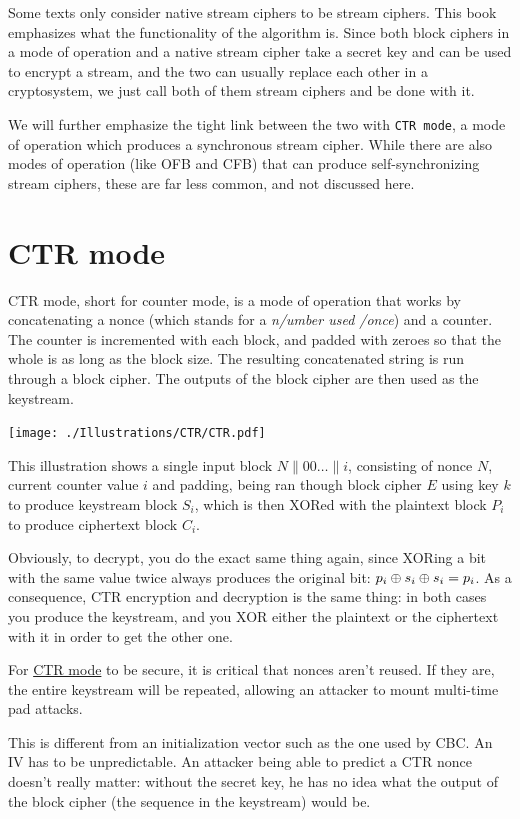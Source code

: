 \documentclass[11pt,ebook,table,dvipsnames]{memoir}
\begin{document}
Some texts only consider native \glspl{stream cipher} to be stream
ciphers. This book emphasizes what the functionality of the algorithm
is. Since both block ciphers in a \gls{mode of operation} and a native
stream cipher take a secret key and can be used to encrypt a stream,
and the two can usually replace each other in a cryptosystem, we just
call both of them stream ciphers and be done with it.

We will further emphasize the tight link between the two with \texttt{CTR
mode}, a mode of operation which produces a synchronous stream
cipher. While there are also modes of operation (like OFB and CFB)
that can produce self-synchronizing stream ciphers, these are far
less common, and not discussed here.
\section{\label{CTR-mode}CTR mode}
\label{sec-2-3-12}

\gls{CTR mode}, short for counter mode, is a \gls{mode of operation}
that works by concatenating a \gls{nonce} (which stands for a \emph{n/umber
used /once}) and a counter. The counter is incremented with each
block, and padded with zeroes so that the whole is as long as the
block size. The resulting concatenated string is run through a block
cipher. The outputs of the block cipher are then used as the
keystream.

\texttt{[image: ./Illustrations/CTR/CTR.pdf]}

This illustration shows a single input block $N \| 00 \ldots \| i$,
consisting of nonce $N$, current counter value $i$ and padding, being
ran though block cipher $E$ using key $k$ to produce keystream block
$S_i$, which is then XORed with the plaintext block $P_i$ to produce
ciphertext block $C_i$.

Obviously, to decrypt, you do the exact same thing again, since XORing
a bit with the same value twice always produces the original bit: $p_i
\oplus s_i \oplus s_i = p_i$. As a consequence, CTR encryption and
decryption is the same thing: in both cases you produce the keystream,
and you XOR either the plaintext or the ciphertext with it in order to
get the other one.

For \hyperref[CTR-mode]{CTR mode} to be secure, it is critical that \glspl{nonce} aren't
reused. If they are, the entire keystream will be repeated, allowing
an attacker to mount multi-time pad attacks.

This is different from an \gls{initialization vector} such as the one
used by CBC. An \gls{IV} has to be unpredictable. An attacker being
able to predict a CTR \gls{nonce} doesn't really matter: without the
secret key, he has no idea what the output of the block cipher (the
sequence in the keystream) would be.
\end{document}
